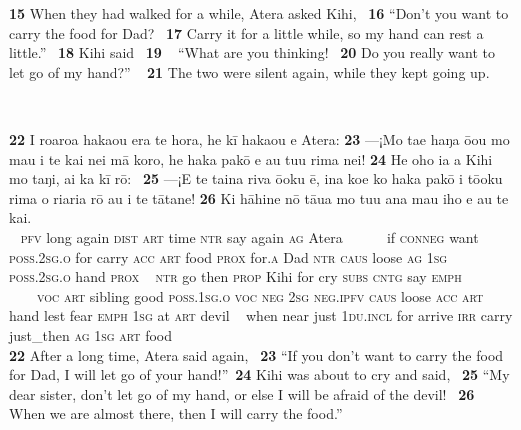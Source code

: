 {\medskip\glt
\textbf{\textup{15}} When they had walked for a while, Atera asked Kihi, ~\textbf{\textup{16}} “Don’t you want to carry the food for Dad? ~\textbf{\textup{17}} Carry it for a little while, so my hand can rest a little.” ~\textbf{\textup{18}} Kihi said ~\textbf{\textup{19~~}}“What are you thinking! ~\textbf{\textup{20}} Do you really want to let go of my hand?” ~
\textbf{\textup{21}} The two were silent again, while they kept going up.


~

\bigskip\gll
\textbf{\textup{22}} I roaroa haka{\ꞌ}ou era te hora, he kī haka{\ꞌ}ou e {\ꞌ}Atera: \textbf{\textup{23}} —¡Mo ta{\ꞌ}e haŋa ō{\ꞌ}ou mo ma{\ꞌ}u i te kai nei mā koro, he haka pakō e au tu{\ꞌ}u rima nei! \textbf{\textup{24}} He oho ia a Kihi mo taŋi, {\ꞌ}ai ka kī rō: ~\textbf{\textup{25}} —¡E te taina riva ō{\ꞌ}oku ē, {\ꞌ}ina koe ko haka pakō i tō{\ꞌ}oku rima {\ꞌ}o ri{\ꞌ}ari{\ꞌ}a rō au {\ꞌ}i te tātane! \textbf{\textup{26}} Ki hāhine nō tāua mo tu{\ꞌ}u ana ma{\ꞌ}u iho e au te kai.\\
~ \textsc{pfv} long again \textsc{dist} \textsc{art} time \textsc{ntr} say again \textsc{ag} Atera ~ ~~~~if \textsc{conneg} want \textsc{poss.2sg.o} for carry \textsc{acc} \textsc{art} food \textsc{prox} for\textsc{.a} Dad \textsc{ntr} \textsc{caus} loose \textsc{ag} \textsc{1sg} \textsc{poss.2sg.o} hand \textsc{prox} ~ \textsc{ntr} go then \textsc{prop} Kihi for cry \textsc{subs} \textsc{cntg} say \textsc{emph} ~ ~~~~\textsc{voc} \textsc{art} sibling good \textsc{poss.1sg.o} \textsc{voc} \textsc{neg} \textsc{2sg} \textsc{neg.ipfv} \textsc{caus} loose \textsc{acc} \textsc{art} hand lest fear \textsc{emph} \textsc{1sg} at \textsc{art} devil  ~ when near just \textsc{1du.incl} for arrive \textsc{irr} carry just\_then \textsc{ag} \textsc{1sg} \textsc{art} food\\

\medskip\glt
\textbf{\textup{22}} After a long time, Atera said again, ~\textbf{\textup{23}} “If you don’t want to carry the food for Dad, I will let go of your hand!”~\textbf{\textup{24}} Kihi was about to cry and said, ~\textbf{\textup{25}} “My dear sister, don’t let go of my hand, or else I will be afraid of the devil! ~\textbf{\textup{26}} When we are almost there, then I will carry the food.”


~

}
